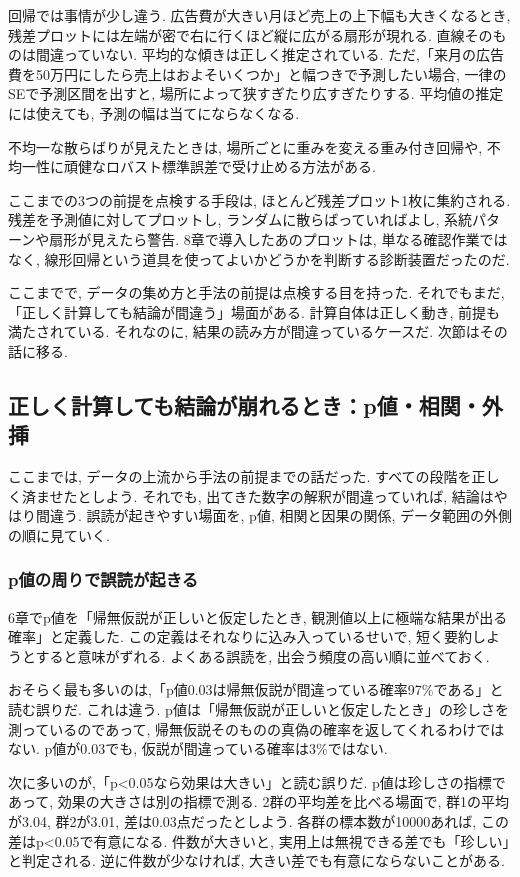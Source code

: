 回帰では事情が少し違う.
広告費が大きい月ほど売上の上下幅も大きくなるとき, 残差プロットには左端が密で右に行くほど縦に広がる扇形が現れる.
直線そのものは間違っていない. 平均的な傾きは正しく推定されている.
ただ,「来月の広告費を50万円にしたら売上はおよそいくつか」と幅つきで予測したい場合, 一律のSEで予測区間を出すと, 場所によって狭すぎたり広すぎたりする.
平均値の推定には使えても, 予測の幅は当てにならなくなる.

不均一な散らばりが見えたときは, 場所ごとに重みを変える重み付き回帰や, 不均一性に頑健なロバスト標準誤差で受け止める方法がある.

ここまでの3つの前提を点検する手段は, ほとんど残差プロット1枚に集約される.
残差を予測値に対してプロットし, ランダムに散らばっていればよし, 系統パターンや扇形が見えたら警告.
8章で導入したあのプロットは, 単なる確認作業ではなく, 線形回帰という道具を使ってよいかどうかを判断する診断装置だったのだ.

ここまでで, データの集め方と手法の前提は点検する目を持った.
それでもまだ,「正しく計算しても結論が間違う」場面がある.
計算自体は正しく動き, 前提も満たされている. それなのに, 結果の読み方が間違っているケースだ.
次節はその話に移る.


\subsection{正しく計算しても結論が崩れるとき：p値・相関・外挿}

ここまでは, データの上流から手法の前提までの話だった.
すべての段階を正しく済ませたとしよう.
それでも, 出てきた数字の解釈が間違っていれば, 結論はやはり間違う.
誤読が起きやすい場面を, p値, 相関と因果の関係, データ範囲の外側の順に見ていく.

\subsubsection*{p値の周りで誤読が起きる}

6章でp値を「帰無仮説が正しいと仮定したとき, 観測値以上に極端な結果が出る確率」と定義した.
この定義はそれなりに込み入っているせいで, 短く要約しようとすると意味がずれる.
よくある誤読を, 出会う頻度の高い順に並べておく.

おそらく最も多いのは,「p値0.03は帰無仮説が間違っている確率97\%である」と読む誤りだ.
これは違う. p値は「帰無仮説が正しいと仮定したとき」の珍しさを測っているのであって, 帰無仮説そのものの真偽の確率を返してくれるわけではない.
p値が0.03でも, 仮説が間違っている確率は3\%ではない.

次に多いのが,「p<0.05なら効果は大きい」と読む誤りだ.
p値は珍しさの指標であって, 効果の大きさは別の指標で測る.
2群の平均差を比べる場面で, 群1の平均が3.04, 群2が3.01, 差は0.03点だったとしよう.
各群の標本数が10000あれば, この差はp<0.05で有意になる.
件数が大きいと, 実用上は無視できる差でも「珍しい」と判定される.
逆に件数が少なければ, 大きい差でも有意にならないことがある.

